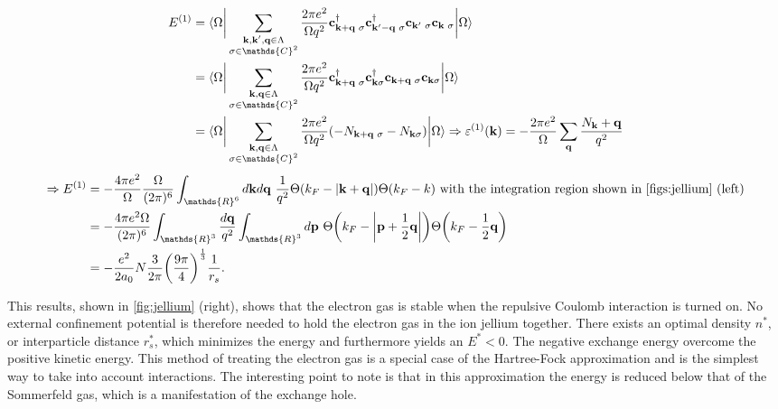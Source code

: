 \documentclass{homework}
\begin{document}
\begin{equation}
    \begin{split}
        E^{(1)} &= \langle {\Omega} \bigg|  \sum_{\substack{{\bf k},{\bf k}',{\bf q} \in \Lambda\\
    \sigma \in \mathds{C}^2}} \frac{2\pi e^2}{\Omega q^2} {\bf c}_{{\bf k}+{\bf q} \blanky \sigma}^\dagger {\bf c}_{{\bf k}'-{\bf q} \blanky \sigma}^\dagger {\bf c}_{{\bf k}' \blanky \sigma} {\bf c}_{{\bf k} \blanky \sigma} \bigg| {\Omega} \rangle \\
    &= \langle {\Omega} \bigg|  \sum_{\substack{{\bf k},{\bf q} \in \Lambda\\
    \sigma \in \mathds{C}^2}} \frac{2\pi e^2}{\Omega q^2} {\bf c}_{{\bf k}+{\bf q} \blanky \sigma}^\dagger {\bf c}_{{\bf k} \sigma}^\dagger {\bf c}_{{\bf k}+{\bf q} \blanky \sigma} {\bf c}_{{\bf k} \sigma} \bigg| {\Omega} \rangle \\
    &= \langle {\Omega} \bigg|  \sum_{\substack{{\bf k},{\bf q} \in \Lambda\\
    \sigma \in \mathds{C}^2}} \frac{2\pi e^2}{\Omega q^2} (-N_{{\bf k}+{\bf q} \blanky \sigma} - N_{{\bf k} \sigma}) \bigg| {\Omega} \rangle  \Rightarrow \varepsilon^{(1)}({\bf k}) = - \frac{2\pi e^2}{\Omega} \sum_{{\bf q}} \frac{N_{{\bf k}} + {\bf q}}{q^2} \\
    \end{split}
\end{equation}
\begin{equation}
    \begin{split}
    \Rightarrow E^{(1)} &= -\frac{4\pi e^2}{\Omega} \frac{\Omega}{(2\pi)^6} \int_{\mathds{R}^6} d{\bf k} d{\bf q} \blanky \frac{1}{q^2} \Theta(k_F - |{\bf k} + {\bf q}|) \Theta(k_F - k) \textnormal{ with the integration region shown in \cref{figs:jellium} (left)}  \\
    &= - \frac{4\pi e^2 \Omega}{(2\pi)^6} \int_{\mathds{R}^3} \frac{d{\bf q}}{q^2} \int_{\mathds{R}^3} d{\bf p} \blanky \Theta\bigg(k_F - \bigg| {\bf p} + \frac{1}{2} {\bf q}\bigg|\bigg) \Theta\bigg(k_F - \frac{1}{2} {\bf q}\bigg) \\
    &= -\frac{e^2}{2a_0} N \frac{3}{2\pi} \bigg(\frac{9 \pi}{4}\bigg)^{\frac{1}{3}} \frac{1}{r_s}.
    \end{split}
\end{equation}

This results, shown in \cref{fig:jellium} (right), shows that the electron gas is stable when the repulsive Coulomb interaction is turned on. No external confinement potential is therefore needed to hold the electron gas in the ion jellium together. There exists an optimal density $n^*$, or interparticle distance $r_s^*$, which minimizes the energy and furthermore yields an $E^* < 0$. The negative exchange energy overcome the positive kinetic energy. This method of treating the electron gas is a special case of the Hartree-Fock approximation and is the simplest way to take into account interactions. The interesting point to note is that in this approximation the energy is reduced below that of the Sommerfeld gas, which is a manifestation of the exchange hole. 
\end{document}
